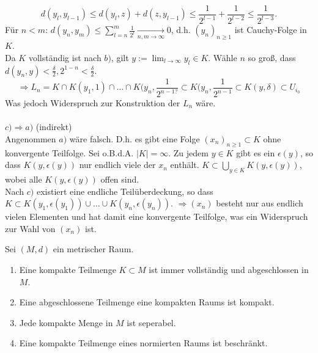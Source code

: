 \begin{beweis}
	\[ d(y_{l}, y_{l - 1}) \leq d(y_{l}, z) + d(z, y_{l - 1}) \leq \frac{1}{2^{l - 1}} + \frac{1}{2^{l - 2}} \leq \frac{1}{2^{l - 3}}. \]
	Für $n < m$: $d(y_{n}, y_{m}) \leq \sum_{l = n}^{m} \frac{1}{2^{l}} \xrightarrow[n, m \rightarrow \infty]{} 0$, d.h. $(y_{n})_{n \geq 1}$ ist Cauchy-Folge in $K$. \\
	Da $K$ vollständig ist nach $b)$, gilt $y := \lim_{l \rightarrow \infty} y_{l} \in K$.
	Wähle $n$ so gro{\ss}, dass $d(y_{n}, y) < \frac{\delta}{2}, 2^{1-n} < \frac{\delta}{2}$. \\
	\[ \Rightarrow L_{n} = K \cap K(y_{1}, 1) \cap \dotsc \cap K(y_{n}, \frac{1}{2^{n - 1 ?}} \subset K(y_{n}, 	\frac{1}{2^{n - 1}} \subset K(y, \delta) \subset U_{i_{0}} \]
	Was jedoch Widerspruch zur Konstruktion der $L_{n}$ wäre. \\ \\
	$c) \Rightarrow a)$ (indirekt) \\
	Angenommen $a)$ wäre falsch. D.h. es gibt eine Folge $(x_{n})_{n \geq 1} \subset K$ ohne konvergente Teilfolge. Sei o.B.d.A. $|K| = \infty$. Zu jedem $y \in K$ gibt es ein $	\epsilon(y)$, so dass $K(y, \epsilon(y))$ nur endlich viele der $x_{n}$ enthält. $K \subset \bigcup_{y \in K} K(y, \epsilon(y))$, wobei alle $K(y, \epsilon(y))$ offen sind. \\
	Nach $c)$ existiert eine endliche Teilüberdeckung, so dass $K \subset K(y_{1}, \epsilon(y_{1})) \cup \dotsc \cup K(y_{n}, \epsilon(y_{n}))$.
	$\Rightarrow (x_{n})$ besteht nur aus endlich vielen Elementen und hat damit eine konvergente Teilfolge, was ein Widerspruch zur Wahl von $(x_{n})$ ist.
\end{beweis}

\begin{prop} \label{prop:6.6}
	Sei $(M, d)$ ein metrischer Raum.
	\begin{enumerate}[label=\alph*\upshape)]
		\item Eine kompakte Teilmenge $K \subset M$ ist immer vollständig und abgeschlossen in $M$.
		\item Eine abgeschlossene Teilmenge eine kompakten Raums ist kompakt.
		\item Jede kompakte Menge in $M$ ist seperabel.
		\item Eine kompakte Teilmenge eines normierten Raums ist beschränkt.
	\end{enumerate}
\end{prop}

